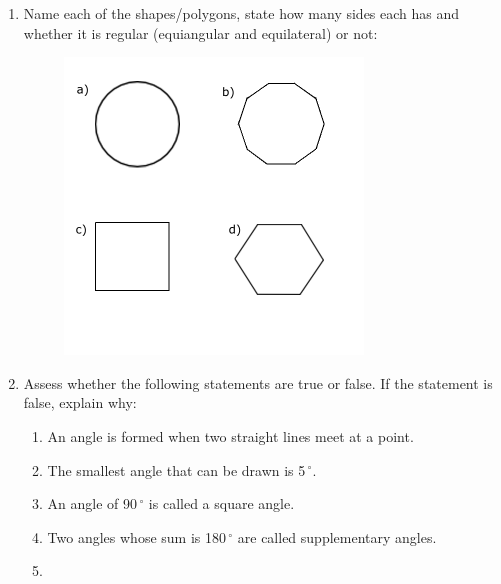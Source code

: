 \begin{enumerate}[noitemsep, label=\textbf{\arabic*}. ]
\begin{figure}[H]
\begin{center}
{col11306.imgs/m39368_MG10C13_067.png} %
\vspace{2pt}
\vspace{.1in}
\end{center}
\end{figure}       

\item Name each of the shapes/polygons, state how many sides each has and
whether it is regular (equiangular and equilateral) or not:
\setcounter{subfigure}{0}
\begin{figure}[H] %
\begin{center}
\label{m39368*id401233!!!underscore!!!media}\label{
m39368*id401233!!!underscore!!!printimage}\includegraphics[width=300px]{
col11306.imgs/m39368_MG10C13_068.png} %
\vspace{2pt}
\vspace{.1in}
\end{center}
\end{figure}       
\item Assess whether the following statements are true or false. If the
statement is false, explain why:
\begin{enumerate}[noitemsep, label=\textbf{\alph*}. ] 
\item An angle is formed when two straight lines meet at a point.	\item
The smallest angle that can be drawn is 5\ensuremath{{\,}^{\circ}}.\item An
angle of 90\ensuremath{{\,}^{\circ}} is called a square angle.\item Two angles
whose sum is 180\ensuremath{{\,}^{\circ}} are called supplementary angles.\item

\end{enumerate}
\end{enumerate}
